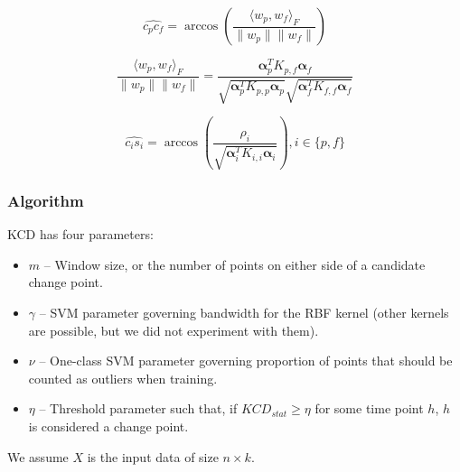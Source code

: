\documentclass[conference,letterpaper]{IEEEtran}
\begin{document}
\begin{equation}
\label{eq:kcd2}
\widehat{c_pc_f} = \arccos \left(\frac{\langle w_p, w_f \rangle_F}{\| w_p \|\| w_f \|} \right)
\end{equation}

\begin{equation}
\label{eq:kcd3}
\frac{\langle w_p, w_f \rangle_F}{\| w_p \|\| w_f \|}  = \frac{\boldsymbol{\alpha}_p^T K_{p, f} \boldsymbol{\alpha}_f }{\sqrt{\boldsymbol{\alpha}_p^T K_{p, p} \boldsymbol{\alpha}_p }\sqrt{\boldsymbol{\alpha}_f^T K_{f, f} \boldsymbol{\alpha}_f }}
\end{equation}

\begin{equation}
\label{eq:kcd4}
\widehat{c_is_i} = \arccos \left(\frac{\rho_i}{\sqrt{\boldsymbol{\alpha}_i^T K_{i,i} \boldsymbol{\alpha}_i }} \right), i \in \{ p, f \}
\end{equation}

\subsubsection{Algorithm}

KCD has four parameters: 

\begin{itemize}
\item $m$ -- Window size, or the number of points on either side of a candidate change point.
\item $\gamma$ -- SVM parameter governing bandwidth for the RBF kernel (other kernels are possible, but we did not experiment with them).
\item $\nu$ -- One-class SVM parameter governing proportion of points that should be counted as outliers when training.
\item $\eta$ -- Threshold parameter such that, if $KCD_{stat} \ge \eta$ for some time point $h$, $h$ is considered a change point.
\end{itemize}

We assume $X$ is the input data of size $n \times k$.
\end{document}
